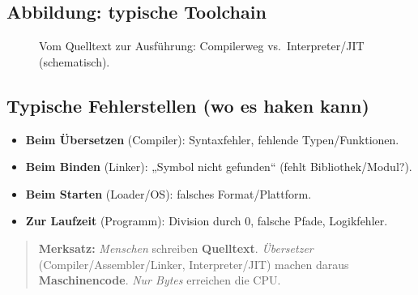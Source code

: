 \documentclass[../skript/main.tex]{subfiles}
\begin{document}
\subsection{Abbildung: typische Toolchain}
\begin{figure}[H]
	\centering
	\caption{Vom Quelltext zur Ausführung: Compilerweg vs.\ Interpreter/JIT (schematisch).}
\end{figure}

\subsection{Typische Fehlerstellen (wo es haken kann)}
\begin{itemize}
	\item \textbf{Beim Übersetzen} (Compiler): Syntaxfehler, fehlende Typen/Funktionen.
	\item \textbf{Beim Binden} (Linker): „Symbol nicht gefunden“ (fehlt Bibliothek/Modul?).
	\item \textbf{Beim Starten} (Loader/OS): falsches Format/Plattform.
	\item \textbf{Zur Laufzeit} (Programm): Division durch 0, falsche Pfade, Logikfehler.
\end{itemize}

\begin{quote}\small
	\textbf{Merksatz:} \emph{Menschen} schreiben \textbf{Quelltext}. \emph{Übersetzer} (Compiler/Assembler/Linker, Interpreter/JIT)
	machen daraus \textbf{Maschinencode}. \emph{Nur Bytes} erreichen die CPU.
\end{quote}


	
\end{document}
